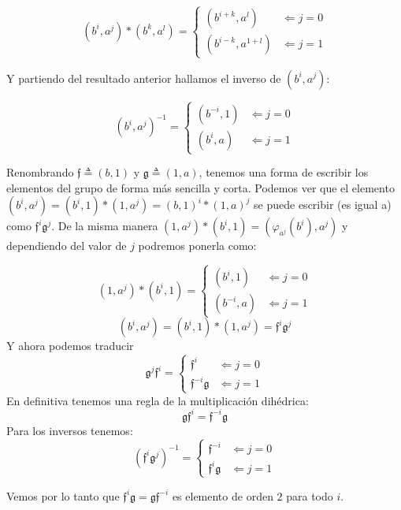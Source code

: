 \documentclass[12pt,a4paper,fleqn,spanish,final,openright]{extbook}
\theoremstyle{definition}
\theoremstyle{remark}
\begin{document}
\[
    (b^i,a^j)*(b^k,a^l) =
    \begin{cases}
        (b^{i+k},a^{l}) & \Leftarrow j = 0 \\
        (b^{i-k},a^{1+l})& \Leftarrow j = 1
    \end{cases}
\]

Y partiendo del resultado anterior hallamos el inverso de $(b^i,a^j)$:

\[
(b^i,a^j)^{-1} =
\begin{cases}
(b^{-i},1) & \Leftarrow j = 0 \\
(b^{i},a)& \Leftarrow j = 1
\end{cases}
\]

Renombrando $\mathfrak{f}\triangleq (b,1)$ y $\mathfrak{g}\triangleq (1,a)$, tenemos una forma de escribir los elementos del grupo de forma más sencilla y corta. Podemos ver que el elemento $(b^i,a^j)=(b^i,1)*(1,a^j)=(b,1)^i * (1,a)^j$ se puede escribir (es igual a) como $\mathfrak{f}^i \mathfrak{g}^j$. De la misma manera $(1,a^j)*(b^i,1)=(\varphi_{a^j}(b^i),a^j)$ y dependiendo del valor de $j$ podremos ponerla como:

\[
(1,a^j)*(b^i,1) = 
\begin{cases}
(b^{i},1) & \Leftarrow j = 0 \\
(b^{-i},a)& \Leftarrow j = 1
\end{cases}
\]
\[
(b^i,a^j)=
(b^i,1)*(1,a^j)=
 \mathfrak{f}^i \mathfrak{g}^j
\]
Y ahora podemos traducir
\[
\mathfrak{g}^j \mathfrak{f}^i = 
\begin{cases}
\mathfrak{f}^i & \Leftarrow j = 0 \\
\mathfrak{f}^{-i} \mathfrak{g}& \Leftarrow j = 1
\end{cases}
\]
En definitiva tenemos una regla de la multiplicación dihédrica:
\[
\mathfrak{g} \mathfrak{f}^i = 
\mathfrak{f}^{-i} \mathfrak{g}
\]
Para los inversos tenemos:
\[
(\mathfrak{f}^i\mathfrak{g}^j)^{-1} =
\begin{cases}
\mathfrak{f}^{-i} & \Leftarrow j = 0 \\
\mathfrak{f}^{i} \mathfrak{g}& \Leftarrow j = 1
\end{cases}
\]

Vemos por lo tanto que $\mathfrak{f}^{i} \mathfrak{g} = \mathfrak{g} \mathfrak{f}^{-i}$ es elemento de orden $2$ para todo $i$.
\end{document}
